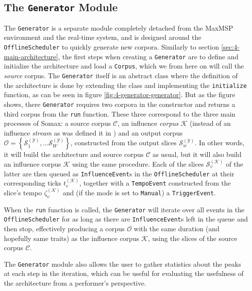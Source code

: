 \subsection{The \texttt{Generator} Module}\label{sec:4-generator-evaluator-generator}
The \texttt{Generator} is a separate module completely detached from the MaxMSP environment and the real-time system, and is designed around the \texttt{Offline\-Scheduler} to quickly generate new corpora. Similarly to section \ref{sec:4-main-architecture}, the first steps when creating a \texttt{Generator} are to define and initialize the architecture and load a \texttt{Corpus}, which we from here on will call the \textit{source} corpus. The \texttt{Generator} itself is an abstract class where the definition of the architecture is done by extending the class and implementing the \texttt{initialize} function, as can be seen in figure \ref{fig:4-generator-generator}. But as the figure shows, there \texttt{Generator} requires two corpora in the constructor and returns a third corpus from the \texttt{run} function. These three correspond to the three main processes of Somax: a source corpus $\mathcal C$, an influence \textit{corpus} $\mathcal K$ (instead of an influence \textit{stream} as was defined it in \cite{somaxtheory2021}) and an output corpus  $\mathcal O = \left\lbrace \mathcal S^{(\mathcal Y)}_1, \dots \mathcal S^{(\mathcal Y)}_W\right\rbrace$, constructed from the output slices $\mathcal S^{(\mathcal Y)}_w$. In other words, it will build the architecture and source corpus $\mathcal C$ as usual, but it will also build an influence corpus $\mathcal K$ using the same procedure. Each of the slices $\mathcal S^{(\mathcal K)}_v$ of the latter are then queued as \texttt{InfluenceEvent}s in the \texttt{OfflineScheduler} at their corresponding ticks $t^{(\mathcal K)}_v$, together with a \texttt{TempoEvent} constructed from the slice's tempo $\zeta^{(\mathcal K)}_v$ and (if the mode is set to \texttt{Manual}) a \texttt{TriggerEvent}.

When the \texttt{run} function is called, the \texttt{Generator} will iterate over all events in the \texttt{OfflineScheduler} for as long as there are \texttt{InfluenceEvent}s left in the queue and then stop, effectively producing a corpus $\mathcal O$ with the same duration (and hopefully same traits) as the influence corpus $\mathcal K$, using the slices of the source corpus $\mathcal C$.

The \texttt{Generator} module also allows the user to gather statistics about the peaks at each step in the iteration, which can be useful for evaluating the usefulness of the architecture from a performer's perspective.

